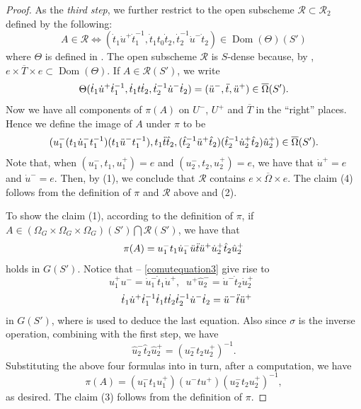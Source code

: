 \documentclass[11pt, reqno]{amsart}
\theoremstyle{plain}
\theoremstyle{definition}
\DeclareMathOperator{\Dom}{Dom} %
\begin{document}
\begin{proof}
   As the \emph{third step}, we further restrict to the open subscheme $\mathcal{R}\subset\mathcal{R}_2$ defined by the following:
    $$A\in \mathcal{R}\iff(\dot{t}_1\dot{u}^+\dot{t}_1^{-1},\dot{t}_1 t_0\dot{t}_2, \dot{t}_2^{-1}\dot{u}^-\dot{t}_2)\in \Dom(\Theta)(S')$$
    where $\Theta$ is defined in . The open subscheme $\mathcal{R}$ is $S$-dense because, by , $e\times \overline{T}\times e\subset \Dom(\Theta)$.
    If $A\in\mathcal{R}(S')$, we write 
    \begin{equation}\label{comutequation3}    \Theta(\dot{t}_1\dot{u}^+\dot{t}_1^{-1},\dot{t}_1 t\dot{t}_2,\dot{t}_2^{-1}\dot{u}^-\dot{t}_2)=(\Ddot{u}^-, \Ddot{t}, \Ddot{u}^+)\in\overline{\Omega}(S').
    \end{equation}
    Now we have all components of $\pi(A)$ on $U^-$, $U^+$ and $\overline{T}$ in the ``right'' places. Hence 
    we define the image of $A$ under $\pi$ to be 
    \begin{equation}\label{definitionofpi}
        (u_1^- (t_1\Dot{u}_1^- t_1^{-1})(t_1\Ddot{u}^-t_1^{-1}),t_1\Ddot{t} \hat{t}_2,(\hat{t}_2^{-1}\Ddot{u}^+\hat{t}_2)(\hat{t}_2^{-1}\dot{u}_2^+\hat{t}_2)\hat{u}_2^+)\in \overline{\Omega}(S').
    \end{equation}
     Note that, when $(u^-_1, t_1,u^+_1)=e$ and $(u^-_2, t_2,u^+_2)=e$, we have that $\dot{u}^+=e$ and $\dot{u}^-=e$. Then, by  (1), we conclude that $\mathcal{R}$ contains $e\times \overline{\Omega}\times e$. The claim (4) follows from the definition of $\pi$ and $\mathcal{R}$ above and  (2).

    To show the claim (1), according to the definition of $\pi$, if $A\in(\Omega_G\times\Omega_G\times\Omega_G)(S')\bigcap\mathcal{R}(S')$, we have that
    \begin{equation}\label{comutequation4}
        \pi(A)=u_1^-t_1\dot{u}_1^-\Ddot{u}\Ddot{t}\Ddot{u}^+\dot{u}_2^+\hat{t}_2\hat{u}_2^+
    \end{equation}
    holds in $G(S')$.
    Notice that  -- \eqref{comutequation3} give rise to 
    $$u_1^+u^-=\dot{u}_1^-\dot{t}_1\dot{u}^+,\;\;u^+\hat{u}_2^-=\dot{u}^-\dot{t}_2 \dot{u}_2^+\;\;$$
    $$\;\;\dot{t}_1\dot{u}^+\dot{t}_1^{-1}\dot{t}_1t\dot{t}_2\dot{t}_2^{-1}\dot{u}^-\dot{t}_2=\Ddot{u}^- \Ddot{t}\Ddot{u}^+$$
    in $G(S')$,
    where  is used to deduce the last equation. 
    Also since $\sigma$ is the inverse operation, combining with the first step, we have 
    $$\hat{u}_2^-\hat{t}_2\hat{u}_2^+=(u_2^-t_2u_2^+)^{-1}.$$
    Substituting the above four formulas into   in turn, after a computation, we have 
    $$\pi(A)=(u_1^-t_1 u_1^+)(u^-tu^+)(u_2^-t_2u_2^+)^{-1},$$
    as desired. The claim (3) follows from the definition of $\pi$.
\end{proof}
\end{document}
